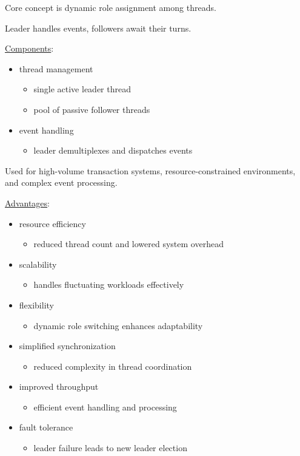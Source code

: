 \documentclass[11pt]{article}
\begin{document}
Core concept is dynamic role assignment among threads.

Leader handles events, followers await their turns.

\uline{Components}:
\begin{itemize}
\item thread management
\begin{itemize}
\item single active leader thread
\item pool of passive follower threads
\end{itemize}
\item event handling
\begin{itemize}
\item leader demultiplexes and dispatches events
\end{itemize}
\end{itemize}

Used for high-volume transaction systems, resource-constrained
environments, and complex event processing.

\uline{Advantages}:
\begin{itemize}
\item resource efficiency
\begin{itemize}
\item reduced thread count and lowered system overhead
\end{itemize}
\item scalability
\begin{itemize}
\item handles fluctuating workloads effectively
\end{itemize}
\item flexibility
\begin{itemize}
\item dynamic role switching enhances adaptability
\end{itemize}
\item simplified synchronization
\begin{itemize}
\item reduced complexity in thread coordination
\end{itemize}
\item improved throughput
\begin{itemize}
\item efficient event handling and processing
\end{itemize}
\item fault tolerance
\begin{itemize}
\item leader failure leads to new leader election
\end{itemize}
\end{itemize}
\end{document}
